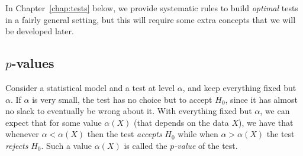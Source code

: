 In Chapter~\ref{chap:tests} below, we provide systematic rules to build \emph{optimal} tests%
%
in a fairly general setting, but this will require some extra concepts that we will be developed later.

\subsection{$p$-values} %

Consider a statistical model and a test at level $\alpha$, and keep everything 
fixed but $\alpha$.
If $\alpha$ is very small, the test has no choice but to accept $H_0$, since it has almost no slack to eventually be wrong about it.%
With everything fixed but $\alpha$, we can expect that for some value $\alpha(X)$ (that depends on the data $X$), we have that whenever $\alpha < \alpha(X)$ then the test \emph{accepts} $H_0$ while when $\alpha > \alpha(X)$ the test \emph{rejects} $H_0$.
Such a value $\alpha(X)$ is called the \emph{$p$-value} of the test.

